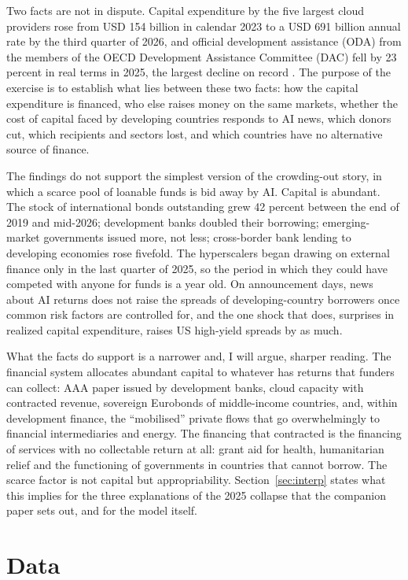 \documentclass[AER]{AEA}
\begin{document}
Two facts are not in dispute. Capital expenditure by the five largest cloud providers rose from USD 154 billion in calendar 2023 to a USD 691 billion annual rate by the third quarter of 2026, and official development assistance (ODA) from the members of the OECD Development Assistance Committee (DAC) fell by 23 percent in real terms in 2025, the largest decline on record \citep{OECD2026ODA}. The purpose of the exercise is to establish what lies between these two facts: how the capital expenditure is financed, who else raises money on the same markets, whether the cost of capital faced by developing countries responds to AI news, which donors cut, which recipients and sectors lost, and which countries have no alternative source of finance.

The findings do not support the simplest version of the crowding-out story, in which a scarce pool of loanable funds is bid away by AI. Capital is abundant. The stock of international bonds outstanding grew 42 percent between the end of 2019 and mid-2026; development banks doubled their borrowing; emerging-market governments issued more, not less; cross-border bank lending to developing economies rose fivefold. The hyperscalers began drawing on external finance only in the last quarter of 2025, so the period in which they could have competed with anyone for funds is a year old. On announcement days, news about AI returns does not raise the spreads of developing-country borrowers once common risk factors are controlled for, and the one shock that does, surprises in realized capital expenditure, raises US high-yield spreads by as much.

What the facts do support is a narrower and, I will argue, sharper reading. The financial system allocates abundant capital to whatever has returns that funders can collect: AAA paper issued by development banks, cloud capacity with contracted revenue, sovereign Eurobonds of middle-income countries, and, within development finance, the ``mobilised'' private flows that go overwhelmingly to financial intermediaries and energy. The financing that contracted is the financing of services with no collectable return at all: grant aid for health, humanitarian relief and the functioning of governments in countries that cannot borrow. The scarce factor is not capital but appropriability. Section~\ref{sec:interp} states what this implies for the three explanations of the 2025 collapse that the companion paper sets out, and for the model itself.

\section{Data}\label{sec:data}
\end{document}
